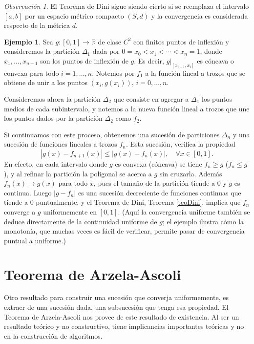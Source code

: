 \documentclass[12pt, a4paper]{amsbook}
\newcommand{\R}{{\mathbb R}}
\theoremstyle{remark}
\newtheorem{obs}[teo]{Observaci\'on}
\theoremstyle{definition}
\newtheorem{ejem}[teo]{Ejemplo}
\numberwithin{section}{chapter}
\numberwithin{subsection}{section}
\numberwithin{equation}{section}
\numberwithin{figure}{chapter}
\begin{document}
\begin{obs}
El Teorema de Dini sigue siendo cierto si se reemplaza el intervalo $[a, b]$ por un espacio métrico compacto $(S, d)$ y la convergencia es considerada respecto de la métrica $d$.
\end{obs}

\begin{ejem}
Sea $g\colon [0,1]\to\R$ de clase $C^2$ con finitos puntos de inflexión y consideremos la partición $\Delta_1$ dada por $0=x_0<x_1<\cdots<x_n=1$, donde $x_1,\dots,x_{n-1}$ son los puntos de inflexión de $g$. Es decir, $g|_{[x_{i-1}, x_i]}$ es cóncava o convexa para todo $i=1,\dots,n$. Notemos por $f_1$ a la función lineal a trozos que se obtiene de unir a los puntos $(x_i, g(x_i))$, $i=0,\dots,n$. 

Consideremos ahora la partición $\Delta_2$ que consiste en agregar a $\Delta_1$ los puntos medios de cada subintervalo, y notemos a la nueva función lineal a trozos que une los puntos dados por la partición $\Delta_2$ como $f_2$.

Si continuamos con este proceso, obtenemos una sucesión de particiones $\Delta_n$ y una sucesión de funciones lineales a trozos $f_n$. Esta sucesión, verifica la propiedad
$$
|g(x)-f_{n+1}(x)|\le |g(x)-f_n(x)|,\quad \forall x\in [0,1].
$$
En efecto, en cada intervalo donde $g$ es convexa (cóncava) se tiene $f_n\ge g$ ($f_n\le g$), y al refinar la partición la poligonal se acerca a $g$ sin cruzarla. Además $f_n(x)\to g(x)$ para todo $x$, pues el tamaño de la partición tiende a $0$ y $g$ es continua. Luego $|g-f_n|$ es una sucesión decreciente de funciones continuas que tiende a $0$ puntualmente, y el Teorema de Dini, Teorema \ref{teoDini}, implica que $f_n$ converge a $g$ uniformemente en $[0,1]$. (Aquí la convergencia uniforme también se deduce directamente de la continuidad uniforme de $g$; el ejemplo ilustra cómo la monotonía, que muchas veces es fácil de verificar, permite pasar de convergencia puntual a uniforme.)
\end{ejem}

\section{Teorema de Arzela-Ascoli}\label{sec.c7.2}
Otro resultado para construir una sucesión que converja uniformemente, es extraer de una sucesión dada, una subsucesión que tenga esa propiedad. El Teorema de Arzela-Ascoli nos provee de este resultado de existencia. Al ser un resultado teórico y no constructivo, tiene implicancias importantes teóricas y no en la construcción de algoritmos.
\end{document}
